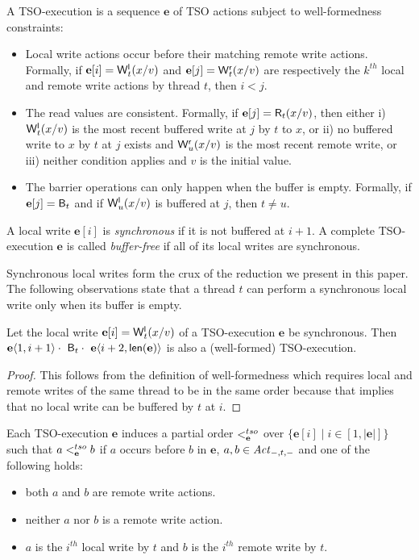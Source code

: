 A TSO-execution is a sequence $\mathbf{e}$ of TSO actions subject to well-formedness constraints:
\begin{itemize}
\item Local write actions occur before their matching remote write actions.
Formally, if $\mathbf{e}[i]=\mathsf{W}^{\mathsf{l}}_{t}(x/v)$ and $\mathbf{e}[j]=\mathsf{W}^{\mathsf{r}}_{t}(x/v)$ are respectively the $k^{th}$ local and remote write actions by thread $t$, then $i<j$.
\item The read values are consistent.
Formally, if $\mathbf{e}[j]=\mathsf{R}_{t}(x/v)$, then either i) $\mathsf{W}^{\mathsf{l}}_{t}(x/v)$ is the most recent buffered write at $j$ by $t$ to $x$, or ii) no buffered write to $x$ by $t$ at $j$ exists and $\mathsf{W}^{\mathsf{r}}_{u}(x/v)$ is the most recent remote write, or iii) neither condition applies and $v$ is the initial value.
\item The barrier operations can only happen when the buffer is empty.
Formally, if $\mathbf{e}[j]=\mathsf{B}_{t}$ and if $\mathsf{W}^{\mathsf{l}}_{u}(x/v)$ is buffered at $j$, then $t\neq u$.
\end{itemize}

\begin{definition}
A local write $\mathbf{e}[i]$ is {\em synchronous} if it is not buffered at $i+1$.
A complete TSO-execution $\mathbf{e}$ is called {\em buffer-free} if all of its local writes are synchronous.
\end{definition}
Synchronous local writes form the crux of the reduction we present in this paper.
The following observations state that a thread $t$ can perform a synchronous local write only when its buffer is empty.
\begin{lemma}\label{lem:synchronous-write}
Let the local write $\mathbf{e}[i]=\mathsf{W}^{\mathsf{l}}_{t}(x/v)$ of a TSO-execution $\mathbf{e}$ be synchronous.
Then $\mathbf{e}\langle 1,i+1\rangle\cdot\ \mathsf{B}_{t}\cdot\ \mathbf{e}\langle i+2,\mathsf{len}(\mathbf{e})\rangle$ is also a (well-formed) TSO-execution.
\end{lemma} 
\begin{proof}
This follows from the definition of well-formedness which requires local and remote writes of the same thread to be in the same order because that implies that no local write can be buffered by $t$ at $i$.
\end{proof}

Each TSO-execution $\mathbf{e}$ induces a partial order $<^{tso}_{\mathbf{e}}$ over $\{\mathbf{e}[i] \mid i\in[1,|\mathbf{e}|]\}$ such that $a<^{tso}_{\mathbf{e}} b$ if $a$ occurs before $b$ in $\mathbf{e}$, $a,b\in\mathit{Act}_{-,t,-}$ and one of the following holds:
\begin{itemize}
\item both $a$ and $b$ are remote write actions.
\item neither $a$ nor $b$ is a remote write action. 
\item $a$ is the $i^{th}$ local write by $t$ and $b$ is the $i^{th}$ remote write by $t$.
\end{itemize}

